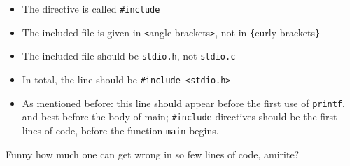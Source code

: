 \begin{itemize}
\begin{itemize}
	\item The directive is called \texttt{\#include}
	\item The included file is given in \texttt{<}angle brackets\texttt{>}, not in \texttt{\{}curly brackets\texttt{\}}
	\item The included file should be \texttt{stdio.h}, not \texttt{stdio.c}
	\item In total, the line should be \texttt{\#include <stdio.h>}
	\item As mentioned before: this line should appear before the first use of \texttt{printf}, and best before the body of main; \texttt{\#include}-directives should be the 
		first lines of code, before the function \texttt{main} begins.
	\end{itemize}
\end{itemize}

Funny how much one can get wrong in so few lines of code, amirite?